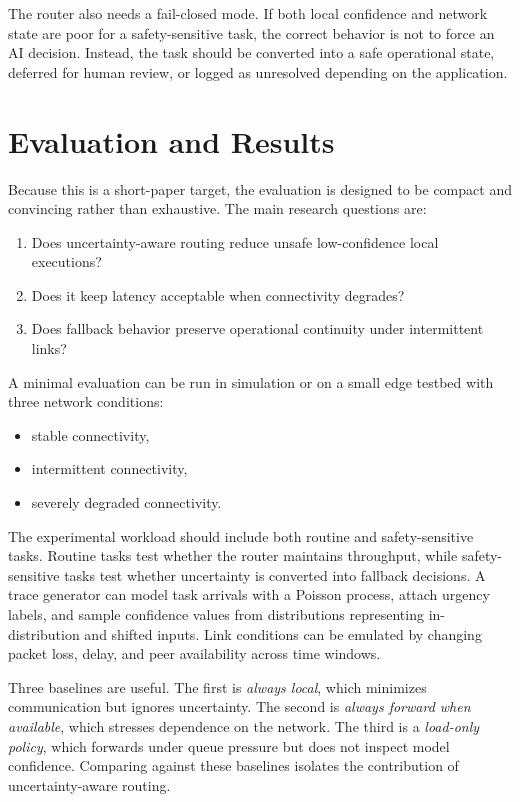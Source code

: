 \documentclass[10pt, conference]{IEEEtran}
\begin{document}
The router also needs a fail-closed mode. If both local confidence and network state are poor for a safety-sensitive task, the correct behavior is not to force an AI decision. Instead, the task should be converted into a safe operational state, deferred for human review, or logged as unresolved depending on the application.

\section{Evaluation and Results}
Because this is a short-paper target, the evaluation is designed to be compact and convincing rather than exhaustive. The main research questions are:
\begin{enumerate}
    \item Does uncertainty-aware routing reduce unsafe low-confidence local executions?
    \item Does it keep latency acceptable when connectivity degrades?
    \item Does fallback behavior preserve operational continuity under intermittent links?
\end{enumerate}

A minimal evaluation can be run in simulation or on a small edge testbed with three network conditions:
\begin{itemize}
    \item stable connectivity,
    \item intermittent connectivity,
    \item severely degraded connectivity.
\end{itemize}

The experimental workload should include both routine and safety-sensitive tasks. Routine tasks test whether the router maintains throughput, while safety-sensitive tasks test whether uncertainty is converted into fallback decisions. A trace generator can model task arrivals with a Poisson process, attach urgency labels, and sample confidence values from distributions representing in-distribution and shifted inputs. Link conditions can be emulated by changing packet loss, delay, and peer availability across time windows.

Three baselines are useful. The first is \emph{always local}, which minimizes communication but ignores uncertainty. The second is \emph{always forward when available}, which stresses dependence on the network. The third is a \emph{load-only policy}, which forwards under queue pressure but does not inspect model confidence. Comparing against these baselines isolates the contribution of uncertainty-aware routing.
\end{document}
